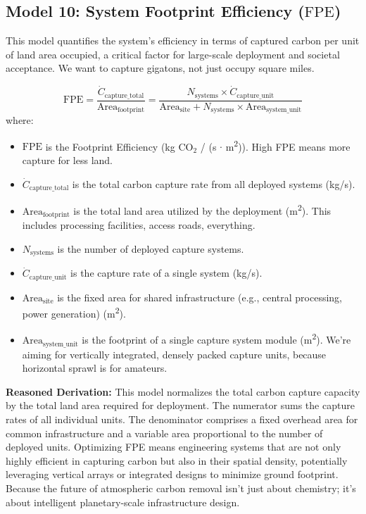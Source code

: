 \documentclass[12pt]{article}
\begin{document}
\subsection*{Model 10: System Footprint Efficiency (\(\text{FPE}\))}
This model quantifies the system's efficiency in terms of captured carbon per unit of land area occupied, a critical factor for large-scale deployment and societal acceptance. We want to capture gigatons, not just occupy square miles.

\begin{equation}
\text{FPE} = \frac{\dot{C}_{\text{capture\_total}}}{\text{Area}_{\text{footprint}}} = \frac{N_{\text{systems}} \times \dot{C}_{\text{capture\_unit}}}{\text{Area}_{\text{site}} + N_{\text{systems}} \times \text{Area}_{\text{system\_unit}}}
\label{eq:footprint_efficiency}
\end{equation}
where:
\begin{itemize}
    \item \(\text{FPE}\) is the Footprint Efficiency (kg CO\(_2\) / (s \(\cdot\) m\textsuperscript{2})). High FPE means more capture for less land.
    \item \(\dot{C}_{\text{capture\_total}}\) is the total carbon capture rate from all deployed systems (kg/s).
    \item \(\text{Area}_{\text{footprint}}\) is the total land area utilized by the deployment (m\textsuperscript{2}). This includes processing facilities, access roads, everything.
    \item \(N_{\text{systems}}\) is the number of deployed capture systems.
    \item \(\dot{C}_{\text{capture\_unit}}\) is the capture rate of a single system (kg/s).
    \item \(\text{Area}_{\text{site}}\) is the fixed area for shared infrastructure (e.g., central processing, power generation) (m\textsuperscript{2}).
    \item \(\text{Area}_{\text{system\_unit}}\) is the footprint of a single capture system module (m\textsuperscript{2}). We're aiming for vertically integrated, densely packed capture units, because horizontal sprawl is for amateurs.
\end{itemize}

\textbf{Reasoned Derivation:} This model normalizes the total carbon capture capacity by the total land area required for deployment. The numerator sums the capture rates of all individual units. The denominator comprises a fixed overhead area for common infrastructure and a variable area proportional to the number of deployed units. Optimizing FPE means engineering systems that are not only highly efficient in capturing carbon but also in their spatial density, potentially leveraging vertical arrays or integrated designs to minimize ground footprint. Because the future of atmospheric carbon removal isn't just about chemistry; it's about intelligent planetary-scale infrastructure design.
\end{document}
